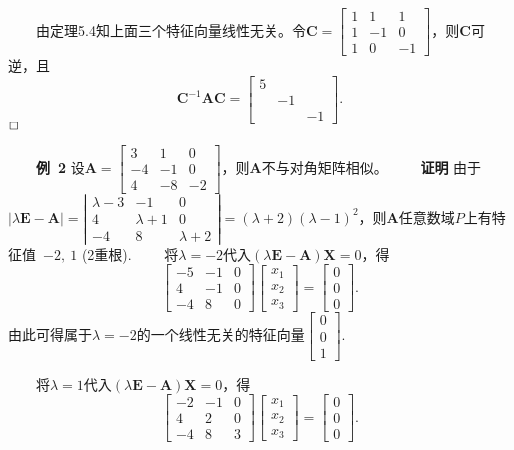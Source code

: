 \documentclass[compress,mathserif,cjk]{beamer}
\theoremstyle{remark}
\numberwithin{equation}{section}
\newcommand{\hei}{\bf}      %
\begin{document}
\begin{CJK}{UTF8}{gbsn}
\begin{frame}
\pause\vskip 5pt
\ \ \ \ 由定理5.4知上面三个特征向量线性无关。令$\bm C=\left[\begin{matrix}1&1&1\\1&-1&0\\1&0&-1\end{matrix}\right]$，则$\bm C$可逆，且
$$\bm C^{-1}\bm{AC}=\left[\begin{matrix}5&&\\&-1&\\&&-1\end{matrix}\right].$$
$\hfill\Box$
\end{frame}

\begin{frame}
\ \ \ \ {\hei 例~2} 设$\bm A=\left[\begin{matrix}3&1&0\\-4&-1&0\\4&-8&-2\end{matrix}\right]$，则$\bm A$不与对角矩阵相似。
\pause\vskip 5pt
\ \ \ \ {\hei 证明} 由于$|\lambda\bm E-\bm A|=\left|\begin{matrix}\lambda-3&-1&0\\4&\lambda+1&0\\-4&8&\lambda+2\end{matrix}\right|=(\lambda+2)(\lambda-1)^2$，则$\bm A$任意数域$P$上有特征值~$-2,~1$ (2重根).
\vskip 2pt
\ \ \ \ 将$\lambda=-2$代入$(\lambda\bm E-\bm A)\bm X=0$，得
$$\left[\begin{matrix}-5&-1&0\\4&-1&0\\-4&8&0\end{matrix}\right]\left[\begin{matrix}x_1\\x_2\\x_3\end{matrix}\right]=\left[\begin{matrix}0\\0\\0\end{matrix}\right].$$
由此可得属于$\lambda=-2$的一个线性无关的特征向量$\left[\begin{matrix}0\\0\\1\end{matrix}\right].$
\end{frame}
\begin{frame}
\ \ \ \ 将$\lambda=1$代入$(\lambda\bm E-\bm A)\bm X=0$，得
$$\left[\begin{matrix}-2&-1&0\\4&2&0\\-4&8&3\end{matrix}\right]\left[\begin{matrix}x_1\\x_2\\x_3\end{matrix}\right]=\left[\begin{matrix}0\\0\\0\end{matrix}\right].$$

\end{frame}
\end{CJK}
\end{document}
